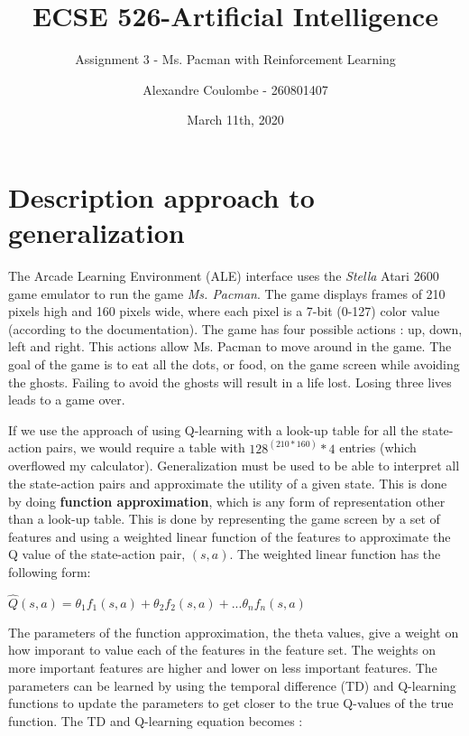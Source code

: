 \documentclass[11pt]{scrartcl}
\begin{document}
\title{ECSE 526-Artificial Intelligence}
\subtitle{Assignment 3 - Ms. Pacman with Reinforcement Learning}
\author{Alexandre Coulombe - 260801407}
\date{March 11th, 2020}
\maketitle

\section{Description approach to generalization}

The Arcade Learning Environment (ALE) interface uses the \textit{Stella} Atari 2600 game emulator to run the game \textit{Ms. Pacman}. The game displays frames of 210 pixels high and 160 pixels wide, where each pixel is a 7-bit (0-127) color value (according to the documentation). The game has four possible actions : up, down, left and right. This actions allow Ms. Pacman to move around in the game. The goal of the game is to eat all the dots, or food, on the game screen while avoiding the ghosts. Failing to avoid the ghosts will result in a life lost. Losing three lives leads to a game over. 

If we use the approach of using Q-learning with a look-up table for all the state-action pairs, we would require a table with $128^(210*160)*4$ entries (which overflowed my calculator). Generalization must be used to be able to interpret all the state-action pairs and approximate the utility of a given state. This is done by doing \textbf{function approximation}, which is any form of representation other than a look-up table. This is done by representing the game screen by a set of features and using a weighted linear function of the features to approximate the Q value of the state-action pair, $(s,a)$. The weighted linear function has the following form:

\begin{center}
$\hat{Q}(s,a) = \theta_1 f_1(s,a) + \theta_2 f_2(s,a)+ ... \theta_n f_n(s,a)$
\end{center}

The parameters of the function approximation, the theta values, give a weight on how imporant to value each of the features in the feature set. The weights on more important features are higher and lower on less important features. The parameters can be learned by using the temporal difference (TD) and Q-learning functions to update the parameters to get closer to the true Q-values of the true function. The TD and Q-learning equation becomes : 
\end{document}
